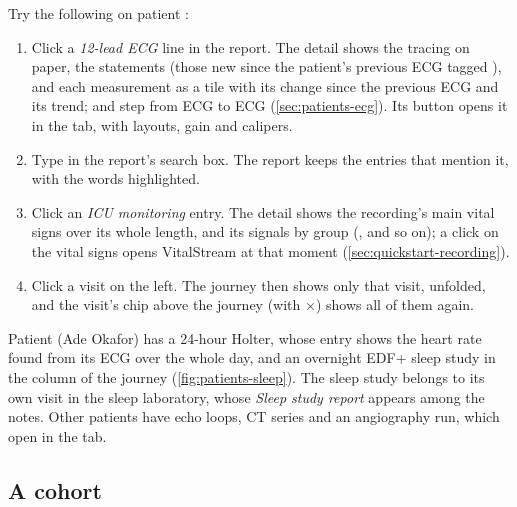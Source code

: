 Try the following on patient :
\begin{enumerate}
\item Click a \emph{12-lead ECG} line in the report. The detail shows the tracing on paper,
  the statements (those new since the patient's previous ECG tagged ), and each
  measurement as a tile with its change since the previous ECG and its trend; \ui{$\langle$} and
  \ui{$\rangle$} step from ECG to ECG (\cref{sec:patients-ecg}). Its button 
  opens it in the  tab, with layouts, gain and calipers.
\item Type  in the report's search box. The report keeps the entries that
  mention it, with the words highlighted.
\item Click an \emph{ICU monitoring} entry. The detail shows the recording's main vital signs
  over its whole length, and its signals by group (,  and
  so on); a click on the vital signs opens VitalStream at that moment
  (\cref{sec:quickstart-recording}).
\item Click a visit on the left. The journey then shows only that visit, unfolded, and the
  visit's chip above the journey (with $\times$) shows all of them again.
\end{enumerate}

Patient  (Ade Okafor) has a 24-hour Holter, whose entry shows the heart rate found
from its ECG over the whole day, and an overnight EDF+ sleep study in the  column of
the journey (\cref{fig:patients-sleep}). The sleep study belongs to its own visit in the
sleep laboratory, whose \emph{Sleep study report} appears among the notes. Other patients have echo loops, CT series and an
angiography run, which open in the  tab.

\subsection{A cohort}
\label{sec:quickstart-cohort}

